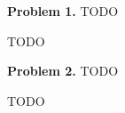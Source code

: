 \documentclass[12pt]{article}
\newenvironment{quo}{\begin{framed}\begin{minipage}{0.97\textwidth}
  \setlength{\parskip}{4mm}
}{\end{minipage}\end{framed}}
\begin{document}
\begin{quo}
  {\bf Problem 1.}
  TODO
\end{quo}
TODO

\begin{quo}
  {\bf Problem 2.}
  TODO
\end{quo}
TODO
\end{document}

